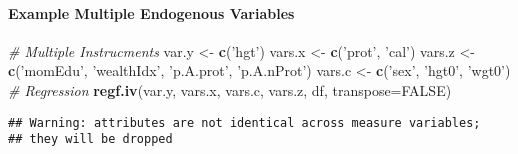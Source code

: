 \documentclass[
]{book}
\newenvironment{Shaded}{\begin{snugshade}}{\end{snugshade}}
\newcommand{\CommentTok}[1]{\textcolor[rgb]{0.56,0.35,0.01}{\textit{#1}}}
\newcommand{\DataTypeTok}[1]{\textcolor[rgb]{0.13,0.29,0.53}{#1}}
\newcommand{\KeywordTok}[1]{\textcolor[rgb]{0.13,0.29,0.53}{\textbf{#1}}}
\newcommand{\NormalTok}[1]{#1}
\newcommand{\OtherTok}[1]{\textcolor[rgb]{0.56,0.35,0.01}{#1}}
\newcommand{\StringTok}[1]{\textcolor[rgb]{0.31,0.60,0.02}{#1}}
\begin{document}
\hypertarget{example-multiple-endogenous-variables}{%
\paragraph{Example Multiple Endogenous Variables}\label{example-multiple-endogenous-variables}}

\begin{Shaded}
\begin{Highlighting}[]
\CommentTok{# Multiple Instrucments}
\NormalTok{var.y <-}\StringTok{ }\KeywordTok{c}\NormalTok{(}\StringTok{'hgt'}\NormalTok{)}
\NormalTok{vars.x <-}\StringTok{ }\KeywordTok{c}\NormalTok{(}\StringTok{'prot'}\NormalTok{, }\StringTok{'cal'}\NormalTok{)}
\NormalTok{vars.z <-}\StringTok{ }\KeywordTok{c}\NormalTok{(}\StringTok{'momEdu'}\NormalTok{, }\StringTok{'wealthIdx'}\NormalTok{, }\StringTok{'p.A.prot'}\NormalTok{, }\StringTok{'p.A.nProt'}\NormalTok{)}
\NormalTok{vars.c <-}\StringTok{ }\KeywordTok{c}\NormalTok{(}\StringTok{'sex'}\NormalTok{, }\StringTok{'hgt0'}\NormalTok{, }\StringTok{'wgt0'}\NormalTok{)}
\CommentTok{# Regression}
\KeywordTok{regf.iv}\NormalTok{(var.y, vars.x, vars.c, vars.z, df, }\DataTypeTok{transpose=}\OtherTok{FALSE}\NormalTok{)}
\end{Highlighting}
\end{Shaded}

\begin{verbatim}
## Warning: attributes are not identical across measure variables;
## they will be dropped
\end{verbatim}
\end{document}
